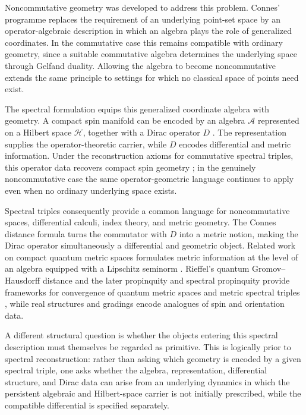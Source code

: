 \documentclass[11pt]{article}
\theoremstyle{definition}
\theoremstyle{remark}
\theoremstyle{definition}
\theoremstyle{remark}
\begin{document}
Noncommutative geometry was developed to address this problem. Connes' programme
replaces the requirement of an underlying point-set space by an operator-algebraic
description in which an algebra plays the role of generalized coordinates. In the
commutative case this remains compatible with ordinary geometry, since a suitable
commutative algebra determines the underlying space through Gelfand duality.
Allowing the algebra to become noncommutative extends the same principle to
settings for which no classical space of points need exist.

The spectral formulation equips this generalized coordinate algebra with geometry.
A compact spin manifold can be encoded by an algebra $\mathcal A$ represented on
a Hilbert space $\mathcal H$, together with a Dirac operator $D$
\cite{Connes1994}. The representation supplies the operator-theoretic carrier,
while $D$ encodes differential and metric information.  Under the reconstruction
axioms for commutative spectral triples, this operator data recovers compact spin
geometry \cite{RennieVarilly2008,connesreconstruction}; in the genuinely
noncommutative case the same operator-geometric language continues to apply even
when no ordinary underlying space exists.

Spectral triples consequently provide a common language for noncommutative spaces,
differential calculi, index theory, and metric geometry. The Connes distance
formula turns the commutator with $D$ into a metric notion, making the Dirac
operator simultaneously a differential and geometric object. Related work on
compact quantum metric spaces formulates metric information at the level of an
algebra equipped with a Lipschitz seminorm \cite{Rieffel1999}.  Rieffel's quantum
Gromov--Hausdorff distance and the later propinquity and spectral propinquity
provide frameworks for convergence of quantum metric spaces and metric spectral
triples \cite{Rieffel2004,Latremoliere2022,FarsiLatremolierePacker2024}, while real
structures and gradings encode analogues of spin and orientation data.

A different structural question is whether the objects entering this spectral
description must themselves be regarded as primitive. This is logically prior to
spectral reconstruction: rather than asking which geometry is encoded by a given
spectral triple, one asks whether the algebra, representation, differential
structure, and Dirac data can arise from an underlying dynamics in which the persistent algebraic and Hilbert-space carrier is not initially prescribed,
while the compatible differential is specified separately.
\end{document}
